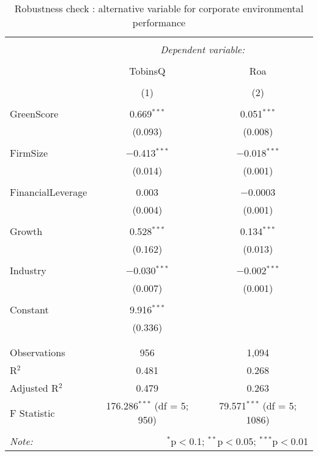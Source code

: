\documentclass[]{article}
\begin{document}
\begin{table}[!htbp] \centering 
  \caption{Robustness check : alternative variable for corporate environmental performance} 
  \label{GreenScoreResults} 
\begin{tabular}{@{\extracolsep{5pt}}lcc} 
\\[-1.8ex]\hline 
\hline \\[-1.8ex] 
 & \multicolumn{2}{c}{\textit{Dependent variable:}} \\ 
\cline{2-3} 
\\[-1.8ex] & TobinsQ & Roa \\ 
\\[-1.8ex] & (1) & (2)\\ 
\hline \\[-1.8ex] 
 GreenScore & 0.669$^{***}$ & 0.051$^{***}$ \\ 
  & (0.093) & (0.008) \\ 
  & & \\ 
 FirmSize & $-$0.413$^{***}$ & $-$0.018$^{***}$ \\ 
  & (0.014) & (0.001) \\ 
  & & \\ 
 FinancialLeverage & 0.003 & $-$0.0003 \\ 
  & (0.004) & (0.001) \\ 
  & & \\ 
 Growth & 0.528$^{***}$ & 0.134$^{***}$ \\ 
  & (0.162) & (0.013) \\ 
  & & \\ 
 Industry & $-$0.030$^{***}$ & $-$0.002$^{***}$ \\ 
  & (0.007) & (0.001) \\ 
  & & \\ 
 Constant & 9.916$^{***}$ &  \\ 
  & (0.336) &  \\ 
  & & \\ 
\hline \\[-1.8ex] 
Observations & 956 & 1,094 \\ 
R$^{2}$ & 0.481 & 0.268 \\ 
Adjusted R$^{2}$ & 0.479 & 0.263 \\ 
F Statistic & 176.286$^{***}$ (df = 5; 950) & 79.571$^{***}$ (df = 5; 1086) \\ 
\hline 
\hline \\[-1.8ex] 
\textit{Note:}  & \multicolumn{2}{r}{$^{*}$p$<$0.1; $^{**}$p$<$0.05; $^{***}$p$<$0.01} \\ 
\end{tabular} 
\end{table}
\end{document}
